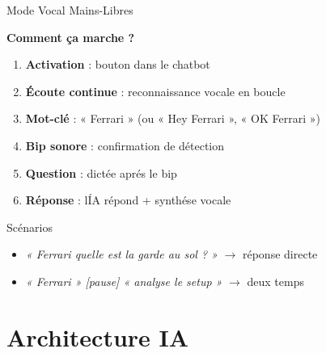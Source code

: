 \documentclass[11pt,aspectratio=169]{beamer}
\begin{document}
\begin{frame}{Mode Vocal Mains-Libres}
  \begin{center}
    \textbf{\textcolor{ferrariRed}{\Large Comment \c{c}a marche ?}}
  \end{center}

  \vspace{0.3cm}
  \begin{enumerate}
    \item \textbf{Activation} : bouton dans le chatbot
    \item \textbf{\'Ecoute continue} : reconnaissance vocale en boucle
    \item \textbf{Mot-cl\'e} : « Ferrari » (ou « Hey Ferrari », « OK Ferrari »)
    \item \textbf{Bip sonore} : confirmation de d\'etection
    \item \textbf{Question} : dict\'ee apr\'es le bip
    \item \textbf{R\'eponse} : l\'IA r\'epond + synth\'ese vocale
  \end{enumerate}

  \vspace{0.3cm}
  \begin{block}{Sc\'enarios}
    \begin{itemize}
      \item \textit{« Ferrari quelle est la garde au sol ? »} $\rightarrow$ r\'eponse directe
      \item \textit{« Ferrari » [pause] « analyse le setup »} $\rightarrow$ deux temps
    \end{itemize}
  \end{block}
\end{frame}

\section{Architecture IA}
\end{document}
